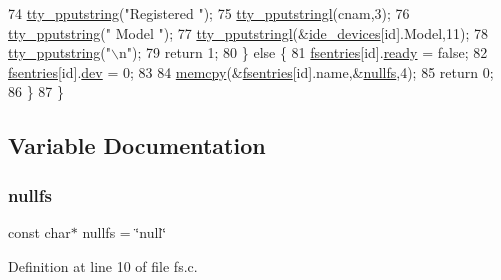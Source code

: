 \begin{DoxyCode}
74         \hyperlink{a00173_ade960b1320324706aac6c00cc6b1b2fe_ade960b1320324706aac6c00cc6b1b2fe}{tty\_pputstring}(\textcolor{stringliteral}{"Registered "});
75         \hyperlink{a00173_abaf93f9e56ddb7b10462070f59e534e4_abaf93f9e56ddb7b10462070f59e534e4}{tty\_pputstringl}(cnam,3);
76         \hyperlink{a00173_ade960b1320324706aac6c00cc6b1b2fe_ade960b1320324706aac6c00cc6b1b2fe}{tty\_pputstring}(\textcolor{stringliteral}{" Model "});
77         \hyperlink{a00173_abaf93f9e56ddb7b10462070f59e534e4_abaf93f9e56ddb7b10462070f59e534e4}{tty\_pputstringl}(&\hyperlink{a00035_ab97a828ed4839b575dc382e2bf826e87_ab97a828ed4839b575dc382e2bf826e87}{ide\_devices}[\textcolor{keywordtype}{id}].Model,11);
78         \hyperlink{a00173_ade960b1320324706aac6c00cc6b1b2fe_ade960b1320324706aac6c00cc6b1b2fe}{tty\_pputstring}(\textcolor{stringliteral}{"\(\backslash\)n"});
79         \textcolor{keywordflow}{return} 1;
80     \} \textcolor{keywordflow}{else} \{
81         \hyperlink{a00152_a6b46131164b26e476762930c9aae4319_a6b46131164b26e476762930c9aae4319}{fsentries}[id].\hyperlink{a00266_a284522ed97fe1eeebd0fcc039b2ea00a_a284522ed97fe1eeebd0fcc039b2ea00a}{ready} = \textcolor{keyword}{false};
82         \hyperlink{a00152_a6b46131164b26e476762930c9aae4319_a6b46131164b26e476762930c9aae4319}{fsentries}[id].\hyperlink{a00266_aaea66ea744fa50f1c54666033884d8d2_aaea66ea744fa50f1c54666033884d8d2}{dev} = 0;
83 
84         \hyperlink{a00131_a370712322c794e949c996946f2283ea8_a370712322c794e949c996946f2283ea8}{memcpy}(&\hyperlink{a00152_a6b46131164b26e476762930c9aae4319_a6b46131164b26e476762930c9aae4319}{fsentries}[\textcolor{keywordtype}{id}].name,&\hyperlink{a00149_a36265ac74fd925405e1179e799961f1e_a36265ac74fd925405e1179e799961f1e}{nullfs},4);
85         \textcolor{keywordflow}{return} 0;
86     \} 
87 \}
\end{DoxyCode}


\subsection{Variable Documentation}
\mbox{\label{a00149_a36265ac74fd925405e1179e799961f1e_a36265ac74fd925405e1179e799961f1e}} 
\subsubsection{\texorpdfstring{nullfs}{nullfs}}
{\footnotesize\ttfamily const char$\ast$ nullfs = \char`\"{}null\char`\"{}}



Definition at line 10 of file fs.\+c.

